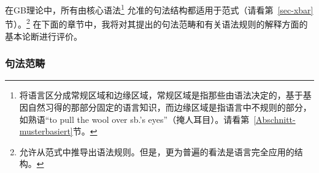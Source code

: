 在GB理论中，所有由核心语法\footnote{
\citet[--8]{Chomsky81a}将语言区分成常规区域和边缘区域，常规区域是指那些由语法决定的，基于基因自然习得的那部分固定的语言知识，而边缘区域是指语言中不规则的部分，如熟语“to pull the wool over sb.'s eyes”（掩人耳目）。请看第~\ref{Abschnitt-musterbasiert}节。
}
允准的句法结构都适用于\xbar 范式（请看第~\ref{sec-xbar}节）。\footnote{
\citet[]{Chomsky70a} 允许从\xbar 范式中推导出语法规则。但是，更为普遍的看法是语言完全应用\xbar 的结构。
}
在下面的章节中，我将对其提出的句法范畴和有关语法规则的解释方面的基本论断进行评价。

\subsubsection{句法范畴}
\label{GB-syntaktische-categoryn}

\largerpage

